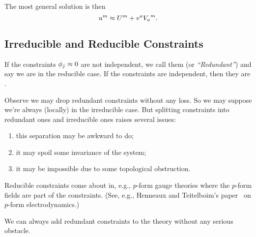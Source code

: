 The most general solution is then
\begin{equation}
u^{m}\approx U^{m} + v^{a}{V_{a}}^{m}.
\end{equation}

\subsection{Irreducible and Reducible Constraints}
\begin{definition}
If the constraints $\phi_{j}\approx0$ are not independent, we call them
 (or \emph{``Redundant''}) and say we are in the
reducible case. If the constraints are independent, then they are
.
\end{definition}

\M
Observe we may drop redundant constraints without any loss. So we may
suppose we're always (locally) in the irreducible case. But splitting
constraints into redundant ones and irreducible ones raises several
issues:
\begin{enumerate}
\item this separation may be awkward to do;
\item it may spoil some invariance of the system;
\item it may be impossible due to some topological obstruction.
\end{enumerate}

\M
Reducible constraints come about in, e.g., $p$-form gauge theories where
the $p$-form fields are part of the constraints. (See, e.g., Henneaux
and Teitelboim's paper~\cite{Henneaux:1986ht} on $p$-form electrodynamics.)

\M
We can always add redundant constraints to the theory without any
serious obstacle.

